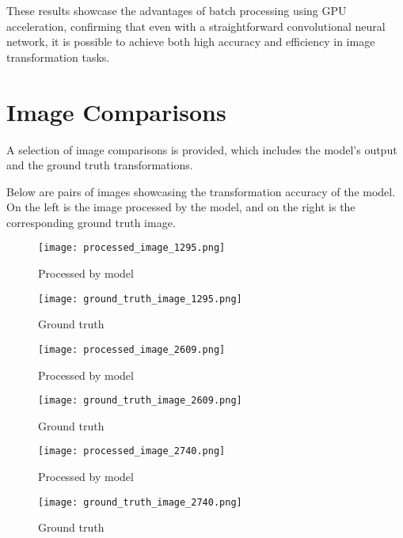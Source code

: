 \documentclass[12pt, a4paper]{article}
\begin{document}
These results showcase the advantages of batch processing using GPU acceleration, confirming that even with a straightforward convolutional neural network, it is possible to achieve both high accuracy and efficiency in image transformation tasks.

\section{Image Comparisons}
A selection of image comparisons is provided, which includes the model's output and the ground truth transformations.

Below are pairs of images showcasing the transformation accuracy of the model. On the left is the image processed by the model, and on the right is the corresponding ground truth image.

\begin{figure}[ht]
  \centering
  \begin{minipage}[b]{0.45\textwidth}
    \texttt{[image: processed\_image\_1295.png]}
    \caption{Processed by model}
    \label{fig:processed_1}
  \end{minipage}
  \hfill %
  \begin{minipage}[b]{0.45\textwidth}
    \texttt{[image: ground\_truth\_image\_1295.png]}
    \caption{Ground truth}
    \label{fig:ground_truth_1}
  \end{minipage}
\end{figure}

\begin{figure}[ht]
  \centering
  \begin{minipage}[b]{0.45\textwidth}
    \texttt{[image: processed\_image\_2609.png]}
    \caption{Processed by model}
    \label{fig:processed_2}
  \end{minipage}
  \hfill
  \begin{minipage}[b]{0.45\textwidth}
    \texttt{[image: ground\_truth\_image\_2609.png]}
    \caption{Ground truth}
    \label{fig:ground_truth_2}
  \end{minipage}
\end{figure}

\begin{figure}[ht]
  \centering
  \begin{minipage}[b]{0.45\textwidth}
    \texttt{[image: processed\_image\_2740.png]}
    \caption{Processed by model}
    \label{fig:processed_3}
  \end{minipage}
  \hfill
  \begin{minipage}[b]{0.45\textwidth}
    \texttt{[image: ground\_truth\_image\_2740.png]}
    \caption{Ground truth}
    \label{fig:ground_truth_3}
  \end{minipage}
\end{figure}
\end{document}
